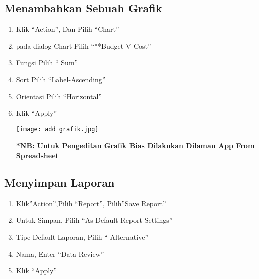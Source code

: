 \documentclass[a4paper,12pt]{report}
\begin{document}
\subsection{Menambahkan Sebuah Grafik}
\begin{enumerate}
    \item Klik “Action”, Dan Pilih “Chart”
    \item pada dialog Chart Pilih “**Budget V Cost”
    \item Fungsi Pilih “ Sum”
    \item Sort Pilih “Label-Ascending”
    \item Orientasi Pilih “Horizontal”
    \item Klik “Apply”
     \begin{center}
    \texttt{[image: add grafik.jpg]}
    \end{center}
\textbf{*NB: Untuk Pengeditan Grafik Bias Dilakukan Dilaman App From Spreadsheet}
\end{enumerate}
\subsection{Menyimpan Laporan}
\begin{enumerate}
    \item Klik”Action”,Pilih “Report”, Pilih”Save Report”
    \item Untuk Simpan, Pilih “As Default Report Settings”
    \item Tipe Default Laporan, Pilih “ Alternative”
    \item Nama, Enter “Data Review”
    \item Klik “Apply”
\end{enumerate}
\end{document}
